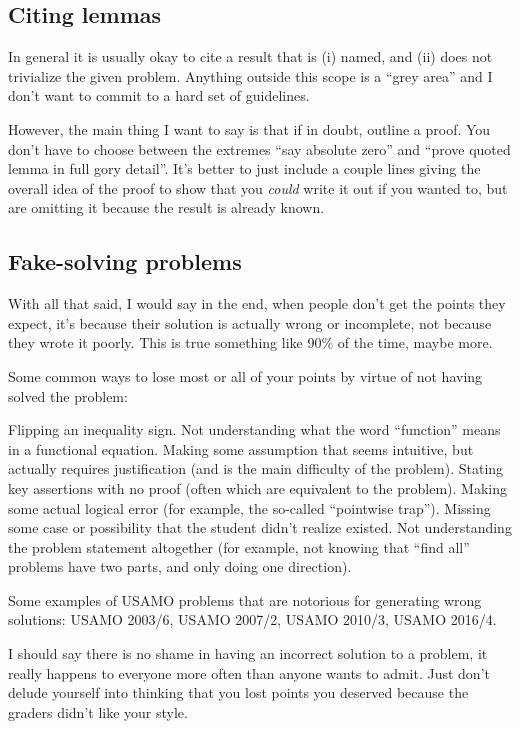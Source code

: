 \documentclass[11pt]{scrartcl}
\begin{document}
\subsection{Citing lemmas}
In general it is usually okay to cite a result that is
(i) named, and (ii) does not trivialize the given problem.
Anything outside this scope is a ``grey area''
and I don't want to commit to a hard set of guidelines.

However, the main thing I want to say is that
\alert{if in doubt, outline a proof}.
You don't have to choose between the extremes
``say absolute zero'' and ``prove quoted lemma in full gory detail''.
It's better to just include a couple lines giving the overall idea of the proof
to show that you \emph{could} write it out if you wanted to,
but are omitting it because the result is already known.

\subsection{Fake-solving problems}
With all that said, I would say in the end,
when \alert{people don't get the points they expect,
it's because their solution is actually wrong or incomplete},
not because they wrote it poorly.
This is true something like 90\% of the time, maybe more.

Some common ways to lose most or all of your points
by virtue of not having solved the problem:
\begin{itemize}
  \ii Flipping an inequality sign.
  \ii Not understanding what the word ``function'' means
  in a functional equation.
  \ii Making some assumption that seems intuitive,
  but actually requires justification (and is the main difficulty of the problem).
  \ii Stating key assertions with no proof
  (often which are equivalent to the problem).
  \ii Making some actual logical error
  (for example, the so-called ``pointwise trap'').
  \ii Missing some case or possibility that the student didn't realize existed.
  \ii Not understanding the problem statement altogether
  (for example, not knowing that ``find all'' problems have two parts,
  and only doing one direction).
\end{itemize}
Some examples of USAMO problems that are notorious for generating wrong solutions:
USAMO 2003/6, USAMO 2007/2, USAMO 2010/3, USAMO 2016/4.

I should say there is no shame in having an incorrect solution to a problem,
it really happens to everyone more often than anyone wants to admit.
Just don't delude yourself into thinking that you lost points
you deserved because the graders didn't like your style.
\end{document}
